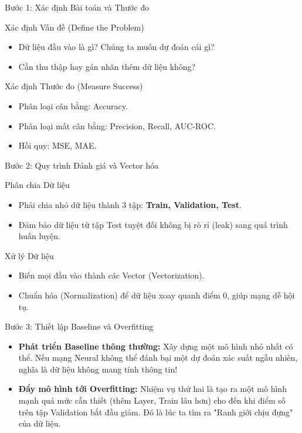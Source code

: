 \documentclass[aspectratio=169]{beamer}
\begin{document}
\begin{frame}{Bước 1: Xác định Bài toán và Thước đo}
    \begin{block}{Xác định Vấn đề (Define the Problem)}
        \begin{itemize}
            \item Dữ liệu đầu vào là gì? Chúng ta muốn dự đoán cái gì?
            \item Cần thu thập hay gán nhãn thêm dữ liệu không?
        \end{itemize}
    \end{block}
    
    \begin{block}{Xác định Thước đo (Measure Success)}
        \begin{itemize}
            \item Phân loại cân bằng: Accuracy.
            \item Phân loại mất cân bằng: Precision, Recall, AUC-ROC.
            \item Hồi quy: MSE, MAE.
        \end{itemize}
    \end{block}
\end{frame}

\begin{frame}{Bước 2: Quy trình Đánh giá và Vector hóa}
    \begin{block}{Phân chia Dữ liệu}
        \begin{itemize}
            \item Phải chia nhỏ dữ liệu thành 3 tập: \textbf{Train, Validation, Test}.
            \item Đảm bảo dữ liệu từ tập Test tuyệt đối không bị rò rỉ (leak) sang quá trình huấn luyện.
        \end{itemize}
    \end{block}
    
    \begin{block}{Xử lý Dữ liệu}
        \begin{itemize}
            \item Biến mọi đầu vào thành các Vector (Vectorization).
            \item Chuẩn hóa (Normalization) để dữ liệu xoay quanh điểm 0, giúp mạng dễ hội tụ.
        \end{itemize}
    \end{block}
\end{frame}

\begin{frame}{Bước 3: Thiết lập Baseline và Overfitting}
    \begin{itemize}
        \item \textbf{Phát triển Baseline thông thường:} Xây dựng một mô hình nhỏ nhất có thể. Nếu mạng Neural không thể đánh bại một dự đoán xác suất ngẫu nhiên, nghĩa là dữ liệu không mang tính thông tin!
        \item \textbf{Đẩy mô hình tới Overfitting:} Nhiệm vụ thứ hai là tạo ra một mô hình mạnh quá mức cần thiết (thêm Layer, Train lâu hơn) cho đến khi điểm số trên tập Validation bắt đầu giảm. Đó là lúc ta tìm ra "Ranh giới chịu đựng" của dữ liệu.
    \end{itemize}
\end{frame}
\end{document}
